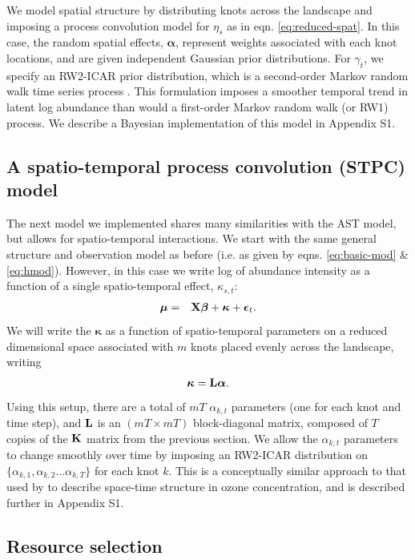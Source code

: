 \documentclass[times,mee,doublespace,]{besauth2}
\begin{document}
We model spatial structure by distributing knots across the landscape and imposing a process convolution model for $\eta_s$ as in eqn. \ref{eq:reduced-spat}.  In this case, the random spatial effects, $\boldsymbol{\alpha}$, represent weights associated with each knot locations, and are given independent Gaussian prior distributions.
For $\gamma_t$, we specify an RW2-ICAR prior distribution, which is a second-order Markov random walk time series process \citep{RueHeld2005}.  This formulation imposes a smoother temporal trend in latent log abundance than would a first-order Markov random walk (or RW1) process.  We describe a Bayesian implementation of this model in Appendix S1.

\subsection{A spatio-temporal process convolution (STPC) model}

The next model we implemented shares many similarities with the AST model, but allows for spatio-temporal interactions.  We start
with the same general structure and observation model as before (i.e. as given by eqns. \ref{eq:basic-mod} \& \ref{eq:hmod}).  However, in this case we write log of abundance intensity as a function of a single spatio-temporal
effect, $\kappa_{s,t}$:
\begin{eqnarray*}
  \boldsymbol{\mu} & = & {\bf X} \boldsymbol{\beta} + \boldsymbol{\kappa} + \boldsymbol{\epsilon}_t.
\end{eqnarray*}
We will write the $\boldsymbol{\kappa}$ as a function of spatio-temporal parameters on a reduced dimensional space associated with $m$ knots placed evenly across the landscape, writing
\begin{eqnarray*}
  \boldsymbol{\kappa} = {\bf L} \boldsymbol{\alpha}.
\end{eqnarray*}
Using this setup, there are a total of $mT$ $\alpha_{k,t}$ parameters (one for each knot and time step), and ${\bf L}$ is an $(mT \times mT)$ block-diagonal matrix, composed of $T$ copies of the ${\bf K}$ matrix from the previous section.  We allow the
$\alpha_{k,t}$ parameters to change smoothly over time by imposing an RW2-ICAR distribution on $\{ \alpha_{k,1}, \alpha_{k,2} \hdots \alpha_{k,T} \}$ for each knot $k$.
This is a conceptually similar approach to that used by \citet{CalderEtAl2002} to describe space-time structure in ozone concentration, and is described further in Appendix S1.

\subsection{Resource selection}
\end{document}
